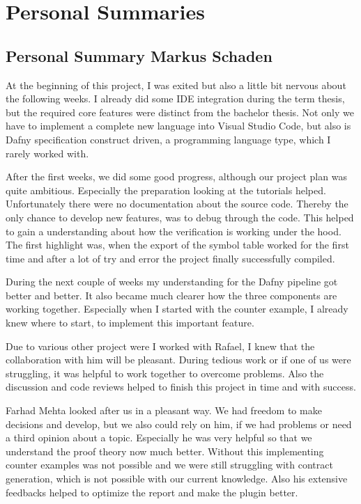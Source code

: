 \section{Personal Summaries}

\subsection{Personal Summary Markus Schaden}
At the beginning of this project, I was exited but also a little bit nervous about the following weeks. I already did some IDE integration during the term thesis, but the required core features were distinct from the bachelor thesis. Not only we have to implement a complete new language into Visual Studio Code, but also is Dafny specification construct driven, a programming language type, which I rarely worked with. \newline

After the first weeks, we did some good progress, although our project plan was quite ambitious. Especially the preparation looking at the tutorials helped. Unfortunately there were no documentation about the source code. Thereby the only chance to develop new features, was to debug through the code. This helped to gain a understanding about how the verification is working under the hood. The first highlight was, when the export of the symbol table worked for the first time and after a lot of try and error the project finally successfully compiled.  \newline

During the next couple of weeks my understanding for the Dafny pipeline got better and better. It also became much clearer how the three components are working together. Especially when I started with the counter example, I already knew where to start, to implement this important feature.  \newline

Due to various other project were I worked with Rafael, I knew that the collaboration with him will be pleasant. During tedious work or if one of us were struggling, it was helpful to work together to overcome problems. Also the discussion and code reviews helped to finish this project in time and with success.   \newline

Farhad Mehta looked after us in a pleasant way. We had freedom to make decisions and develop, but we also could rely on him, if we had problems or need a third opinion about a topic. Especially he was very helpful so that we understand the proof theory now much better. Without this implementing counter examples was not possible and we were still struggling with contract generation, which is not possible with our current knowledge. Also his extensive feedbacks helped to optimize the report and make the plugin better.  \newline

